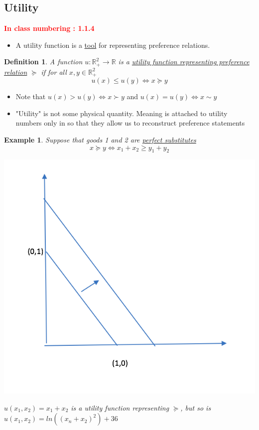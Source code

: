 \documentclass[twoside]{article}
\newtheorem{ex}[theorem]{Example}
\newtheorem{definition}[theorem]{Definition}
\begin{document}
\subsection{Utility}
\textbf{\textcolor{red}{In class numbering : 1.1.4}}
\begin{itemize}
\item A utility function is a \underline{tool} for representing preference relations.
\end{itemize}

\begin{definition}
A function \(u : \mathbb{R}_+^2 \rightarrow \mathbb{R} \) is a \underline{utility function representing preference relation} \(\succeq\) if for all \(x, y \in \mathbb{R}^2_+\)
\[ u(x) \leq u(y) \iff x \succeq y\]
\end{definition}
\begin{itemize}
\item Note that \(u(x) > u(y) \iff x \succ y\) and \(u(x) = u(y) \iff x \sim y \)
\item "Utility" is not some physical quantity. Meaning is attached to utility numbers only in so that they allow us to reconstruct preference statements 
\end{itemize}

\begin{ex}
Suppose that goods 1 and 2 are \underline{perfect substitutes}
\[ x \succeq y \iff x_1 + x_2 \geq y_1 + y_2\]
\begin{center}
\includegraphics[scale=0.4]{8}
\end{center}
\(u(x_1, x_2) = x_1 + x_2\) is a utility function representing \(\succeq\), but so is \(u(x_1, x_2) = ln((x_n + x_2)^2) + 36\)
\end{ex}
\end{document}
